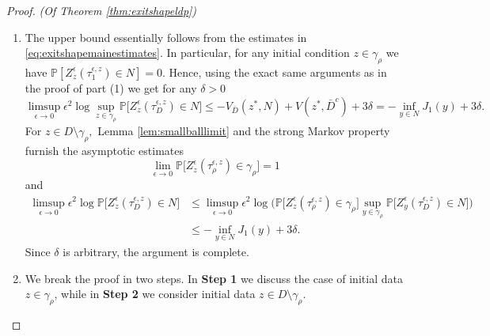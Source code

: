 \documentclass[10pt, reqno]{amsart}
\newcommand{\pr}{\mathbb{P}}
\theoremstyle{definition}
\numberwithin{lem}{section}
\numberwithin{cor}{section}
\numberwithin{prop}{section}
\numberwithin{thm}{section}
\numberwithin{dfn}{section}
\begin{document}
\begin{proof}{\textit{(Of Theorem \ref{thm:exitshapeldp})}}
\begin{enumerate}
    \item The upper bound essentially follows from the estimates in  \eqref{eq:exitshapemainestimates}. In particular, for any initial condition $z\in\gamma_\rho$ we have $\pr[Z_z^\epsilon(\tau_1^{\epsilon, z})\in N]=0.$ Hence, using the exact same arguments as in the proof of part (1) we get for any $\delta>0$
    $$\limsup_{\epsilon\to 0}\epsilon^2\log\sup_{z\in\gamma_\rho}\pr\bigg[Z^\epsilon_z(\tau^{\epsilon, z}_{D})\in N\bigg]\leq -V_{\bar{D}}(z^*,N)+V(z^*,\bar{D}^{c})+3\delta=
    -\inf_{y\in N}J_1(y)+3\delta.$$
   For $z\in D\setminus\gamma_\rho,$ Lemma \ref{lem:smallballlimit} and the strong Markov property furnish the asymptotic estimates
    $$ \lim_{\epsilon\to 0}\pr\bigg[Z^\epsilon_z(\tau^{\epsilon, z}_{\rho})\in \gamma_\rho   \bigg]=1$$
    and 
    \begin{equation*}
        \begin{aligned}
\limsup_{\epsilon\to 0}\epsilon^2\log\pr\bigg[Z^\epsilon_z(\tau^{\epsilon, z}_{D})\in N\bigg]&\leq \limsup_{\epsilon\to 0}\epsilon^2\log\bigg(\pr\bigg[Z^\epsilon_z(\tau^{\epsilon, z}_{\rho})\in \gamma_\rho   \bigg]\sup_{y\in\gamma_\rho}\pr\bigg[Z^\epsilon_y(\tau^{\epsilon, z}_{D})\in N\bigg]\bigg)
\\&\leq -\inf_{y\in N}J_1(y)+3\delta.
        \end{aligned}
    \end{equation*}
Since $\delta$ is arbitrary, the argument is complete.
\item 
\noindent We break the proof in two steps. In \textbf{Step 1} we discuss the case of initial data $z\in\gamma_\rho$, while in \textbf{Step 2} we consider initial data $z\in D\setminus\gamma_\rho$. 


\end{enumerate}
\end{proof}
\end{document}
